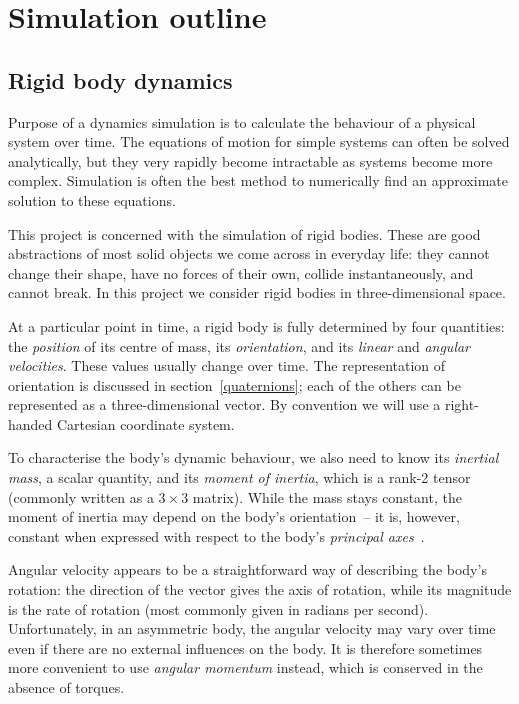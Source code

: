 \section{Simulation outline}

\subsection{Rigid body dynamics}

Purpose of a dynamics simulation is to calculate the behaviour of a physical system over time.
The equations of motion for simple systems can often be solved analytically, but they very
rapidly become intractable as systems become more complex. Simulation is often the best
method to numerically find an approximate solution to these equations.

This project is concerned with the simulation of rigid bodies. These are good abstractions of
most solid objects we come across in everyday life: they cannot change their shape, have no
forces of their own, collide instantaneously, and cannot break. In this project we consider
rigid bodies in three-dimensional space.

At a particular point in time, a rigid body is fully determined by four quantities: the
\emph{position} of its centre of mass, its \emph{orientation}, and its \emph{linear} and
\emph{angular velocities}. These values usually change over time. The representation of
orientation is discussed in section~\ref{quaternions}; each of the others can be
represented as a three-dimensional vector. By convention we will use a right-handed Cartesian
coordinate system.

To characterise the body's dynamic behaviour, we also need to know its \emph{inertial mass},
a scalar quantity, and its \emph{moment of inertia}, which is a rank-2 tensor (commonly written
as a $3\times3$ matrix). While the mass stays constant, the moment of inertia may
depend on the body's orientation~-- it is, however, constant when expressed with respect to the
body's \emph{principal axes}~\cite{Feynman:63}.

Angular velocity appears to be a straightforward way of describing the body's rotation: the
direction of the vector gives the axis of rotation, while its magnitude is the rate of rotation
(most commonly given in radians per second). Unfortunately, in an asymmetric body, the angular
velocity may vary over time even if there are no external influences on the body. It is therefore
sometimes more convenient to use \emph{angular momentum} instead, which is conserved in the
absence of torques.

